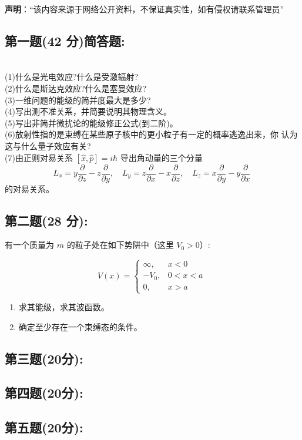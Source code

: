 
\textbf{声明}：“该内容来源于网络公开资料，不保证真实性，如有侵权请联系管理员”

\subsection{第一题(42 分)简答题:}\\
(1)什么是光电效应?什么是受激辐射?\\
(2)什么是斯达克效应?什么是塞曼效应?\\
(3)一维问题的能级的简并度最大是多少?\\
(4)写出测不准关系，并简要说明其物理含义。\\
(5)写出非简并微扰论的能级修正公式(到二阶)。\\
(6)放射性指的是束缚在某些原子核中的更小粒子有一定的概率逃逸出来，你
认为这与什么量子效应有关?\\
(7)由正则对易关系 $[\hat{x}, \hat{p}] = i\hbar$ 导出角动量的三个分量
\[
L_x = y \frac{\partial}{\partial z} - z \frac{\partial}{\partial y}, \quad 
L_y = z \frac{\partial}{\partial x} - x \frac{\partial}{\partial z}, \quad 
L_z = x \frac{\partial}{\partial y} - y \frac{\partial}{\partial x}~
\]
的对易关系。

\subsection{第二题(28 分):}
有一个质量为 $m$ 的粒子处在如下势阱中（这里 $V_0 > 0$）:

\[
V(x) =
\begin{cases}
\infty, & x < 0 \\
-V_0, & 0 < x < a \\
0, & x > a
\end{cases}~
\]

\begin{enumerate}
    \item  求其能级，求其波函数。
    \item  确定至少存在一个束缚态的条件。
\end{enumerate}
\subsection{第三题(20分):}

\subsection{第四题(20分):}

\subsection{第五题(20分):}
